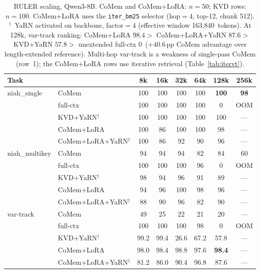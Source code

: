 \begin{table}[t]
\centering
\small
\begin{tabular}{@{}llcccccc@{}}
\toprule
\textbf{Task} & & 8k & 16k & 32k & 64k & 128k & 256k \\
\midrule
\multirow{5}{*}{niah\_single} & CoMem & 100 & 100 & 100 & 100 & \textbf{100} & \textbf{98} \\
 & full-ctx & 100 & 100 & 100 & 100 & 0 & OOM \\
 & KVD+YaRN$^\dagger$ & 100 & 100 & 100 & 100 & 100 & --- \\
 & CoMem+LoRA & 100 & 86 & 100 & 100 & 98 & --- \\
 & CoMem+LoRA+YaRN$^\dagger$ & 100 & 86 & 92 & 90 & 96 & --- \\
\midrule
\multirow{5}{*}{niah\_multikey} & CoMem & 94 & 94 & 94 & 82 & 84 & 60 \\
 & full-ctx & 100 & 100 & 100 & 96 & 0 & OOM \\
 & KVD+YaRN$^\dagger$ & 98 & 94 & 96 & 91 & 89 & --- \\
 & CoMem+LoRA & 94 & 96 & 100 & 98 & 96 & --- \\
 & CoMem+LoRA+YaRN$^\dagger$ & 88 & 90 & 96 & 82 & 90 & --- \\
\midrule
\multirow{5}{*}{var-track} & CoMem & 49 & 25 & 22 & 21 & 20 & --- \\
 & full-ctx & 100 & 100 & 100 & 98 & 0 & OOM \\
 & KVD+YaRN$^\dagger$ & 99.2 & 99.4 & 26.6 & 67.2 & 57.8 & --- \\
 & CoMem+LoRA & 98.0 & 98.4 & 98.8 & 97.6 & \textbf{98.4} & --- \\
 & CoMem+LoRA+YaRN$^\dagger$ & 81.2 & 86.0 & 90.4 & 96.8 & 87.6 & --- \\
\bottomrule
\end{tabular}
\caption{RULER scaling, Qwen3-8B. CoMem and CoMem+LoRA: $n{=}50$; KVD rows: $n{=}100$.
CoMem+LoRA uses the \texttt{iter\_bm25} selector (hop$=4$, top-12, chunk 512).
$^\dagger$~YaRN activated on backbone, factor$=4$ (effective window 163{,}840~tokens).
At 128k, var-track ranking:
CoMem+LoRA $98.4 >$ CoMem+LoRA+YaRN $87.6 >$ KVD+YaRN $57.8 >$ unextended full-ctx $0$~($+40.6$\,pp CoMem advantage over length-extended reference).
Multi-hop var-track is a weakness of single-pass CoMem (row~1); the CoMem+LoRA rows use iterative retrieval (Table~\ref{tab:itervt}).}
\label{tab:scaling}
\end{table}
